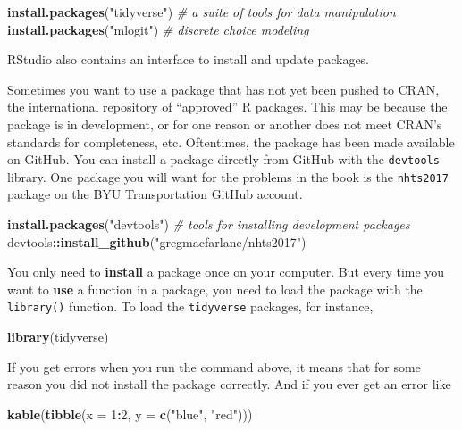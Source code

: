 \documentclass[]{book}
\newenvironment{Shaded}{\begin{snugshade}}{\end{snugshade}}
\newcommand{\CommentTok}[1]{\textcolor[rgb]{0.56,0.35,0.01}{\textit{#1}}}
\newcommand{\DataTypeTok}[1]{\textcolor[rgb]{0.13,0.29,0.53}{#1}}
\newcommand{\DecValTok}[1]{\textcolor[rgb]{0.00,0.00,0.81}{#1}}
\newcommand{\KeywordTok}[1]{\textcolor[rgb]{0.13,0.29,0.53}{\textbf{#1}}}
\newcommand{\NormalTok}[1]{#1}
\newcommand{\OperatorTok}[1]{\textcolor[rgb]{0.81,0.36,0.00}{\textbf{#1}}}
\newcommand{\StringTok}[1]{\textcolor[rgb]{0.31,0.60,0.02}{#1}}
\begin{document}
\begin{Shaded}
\begin{Highlighting}[]
\KeywordTok{install.packages}\NormalTok{(}\StringTok{"tidyverse"}\NormalTok{) }\CommentTok{# a suite of tools for data manipulation}
\KeywordTok{install.packages}\NormalTok{(}\StringTok{"mlogit"}\NormalTok{) }\CommentTok{# discrete choice modeling}
\end{Highlighting}
\end{Shaded}

RStudio also contains an interface to install and update packages.

Sometimes you want to use a package that has not yet been pushed to CRAN, the
international repository of ``approved'' R packages. This may be because the package
is in development, or for one reason or another does not meet CRAN's standards
for completeness, etc. Oftentimes, the package has been made available on GitHub.
You can install a package directly from GitHub with the \texttt{devtools} library. One
package you will want for the problems in the book is the \texttt{nhts2017} package
on the BYU Transportation GitHub account.

\begin{Shaded}
\begin{Highlighting}[]
\KeywordTok{install.packages}\NormalTok{(}\StringTok{"devtools"}\NormalTok{) }\CommentTok{# tools for installing development packages}
\NormalTok{devtools}\OperatorTok{::}\KeywordTok{install_github}\NormalTok{(}\StringTok{"gregmacfarlane/nhts2017"}\NormalTok{)}
\end{Highlighting}
\end{Shaded}

You only need to \textbf{install} a package once on your computer. But every time you
want to \textbf{use} a function in a package, you need to load the package with the
\texttt{library()} function. To load the \texttt{tidyverse} packages, for instance,

\begin{Shaded}
\begin{Highlighting}[]
\KeywordTok{library}\NormalTok{(tidyverse)}
\end{Highlighting}
\end{Shaded}

If you get errors when you run the command above, it means that for some reason
you did not install the package correctly. And if you ever get an error like

\begin{Shaded}
\begin{Highlighting}[]
\KeywordTok{kable}\NormalTok{(}\KeywordTok{tibble}\NormalTok{(}\DataTypeTok{x =} \DecValTok{1}\OperatorTok{:}\DecValTok{2}\NormalTok{, }\DataTypeTok{y =} \KeywordTok{c}\NormalTok{(}\StringTok{"blue"}\NormalTok{, }\StringTok{"red"}\NormalTok{)))}
\end{Highlighting}
\end{Shaded}
\end{document}
